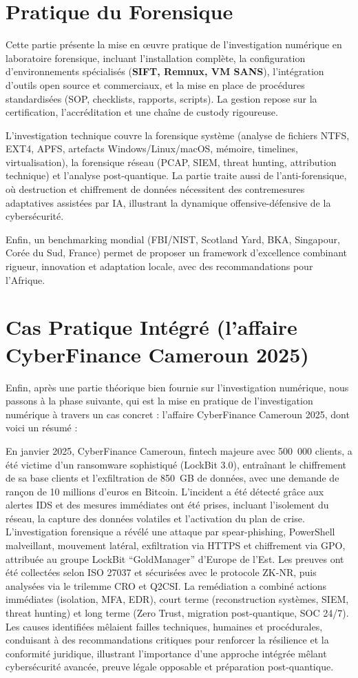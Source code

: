 \documentclass[memoire, 12pt]{report}
\begin{document}
\section*{Pratique du Forensique}
Cette partie présente la mise en œuvre pratique de l’investigation numérique en laboratoire forensique, incluant l’installation complète, la configuration d’environnements spécialisés (\textbf{SIFT, Remnux, VM SANS}), l’intégration d’outils open source et commerciaux, et la mise en place de procédures standardisées (SOP, checklists, rapports, scripts). La gestion repose sur la certification, l’accréditation et une chaîne de custody rigoureuse.

L’investigation technique couvre la forensique système (analyse de fichiers NTFS, EXT4, APFS, artefacts Windows/Linux/macOS, mémoire, timelines, virtualisation), la forensique réseau (PCAP, SIEM, threat hunting, attribution technique) et l’analyse post-quantique. La partie traite aussi de l’anti-forensique, où destruction et chiffrement de données nécessitent des contremesures adaptatives assistées par IA, illustrant la dynamique offensive-défensive de la cybersécurité.

Enfin, un benchmarking mondial (FBI/NIST, Scotland Yard, BKA, Singapour, Corée du Sud, France) permet de proposer un framework d’excellence combinant rigueur, innovation et adaptation locale, avec des recommandations pour l’Afrique.


\section*{Cas Pratique Intégré (l’affaire CyberFinance Cameroun 2025)}
	Enfin, après une partie théorique bien fournie sur l’investigation numérique, nous passons à la phase suivante, qui est la mise en pratique de l’investigation numérique à travers un cas concret : l’affaire CyberFinance Cameroun 2025, dont voici un résumé :

En janvier 2025, CyberFinance Cameroun, fintech majeure avec 500~000 clients, a été victime d'un ransomware sophistiqué (LockBit 3.0), entraînant le chiffrement de sa base clients et l'exfiltration de 850~GB de données, avec une demande de rançon de 10 millions d'euros en Bitcoin. L'incident a été détecté grâce aux alertes IDS et des mesures immédiates ont été prises, incluant l'isolement du réseau, la capture des données volatiles et l'activation du plan de crise. L'investigation forensique a révélé une attaque par spear-phishing, PowerShell malveillant, mouvement latéral, exfiltration via HTTPS et chiffrement via GPO, attribuée au groupe LockBit ``GoldManager'' d'Europe de l'Est. Les preuves ont été collectées selon ISO 27037 et sécurisées avec le protocole ZK-NR, puis analysées via le trilemme CRO et Q2CSI. La remédiation a combiné actions immédiates (isolation, MFA, EDR), court terme (reconstruction systèmes, SIEM, threat hunting) et long terme (Zero Trust, migration post-quantique, SOC 24/7). Les causes identifiées mêlaient failles techniques, humaines et procédurales, conduisant à des recommandations critiques pour renforcer la résilience et la conformité juridique, illustrant l'importance d'une approche intégrée mêlant cybersécurité avancée, preuve légale opposable et préparation post-quantique.
\end{document}
